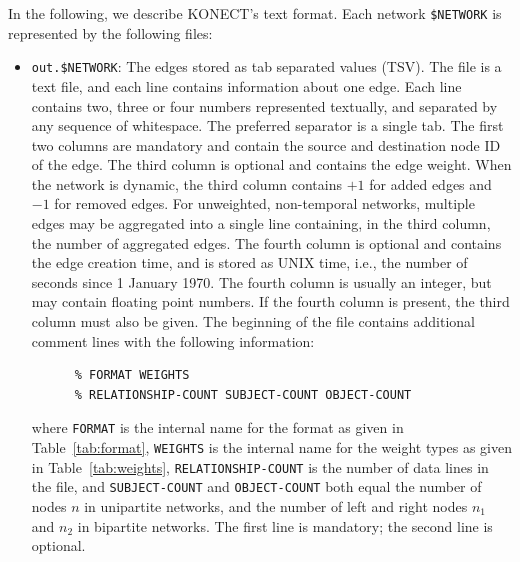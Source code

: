 \documentclass{article}
\begin{document}
In the following, we describe KONECT's text format.  Each network
\texttt{\$NETWORK} is represented by the following files:
\begin{itemize}
  \item \texttt{out.\$NETWORK}: The edges stored as tab separated values
    (TSV).  The file is a text file, and each line contains information
    about one edge.  Each line contains two, three or four numbers
    represented textually, and separated by any sequence of whitespace. 
    The preferred separator is a single tab. 
    The first two  
    columns are mandatory and contain the source and destination node ID
    of the edge.  The third column is optional and contains the edge
    weight.  When the network is dynamic, the third column contains $+1$
    for added edges and $-1$ for removed edges.  For unweighted,
    non-temporal networks, multiple edges may be aggregated into a
    single line containing, in the third column, the number of
    aggregated edges.  The fourth column is optional and contains the
    edge creation time, and is stored as UNIX time, i.e., the number of
    seconds since 1 January 1970.  The fourth column is usually an
    integer, but may contain floating point numbers.  If the fourth
    column is present, the 
    third column must also be given.  The beginning of the file contains
    additional comment lines with the following information:

    \begin{verbatim}
      % FORMAT WEIGHTS 
      % RELATIONSHIP-COUNT SUBJECT-COUNT OBJECT-COUNT
    \end{verbatim}

    where \texttt{FORMAT} is the internal name for the format as given
    in Table~\ref{tab:format}, \texttt{WEIGHTS} is the internal name for
    the weight types as given in Table~\ref{tab:weights},
    \texttt{RELATIONSHIP-COUNT} is the number of data lines in the file,
    and \texttt{SUBJECT-COUNT} and \texttt{OBJECT-COUNT} both equal the
    number of nodes $n$ in unipartite networks, and the number of left
    and right nodes $n_1$ and $n_2$ in bipartite networks.  The first
    line is mandatory; the second line is optional.


\end{itemize}
\end{document}
